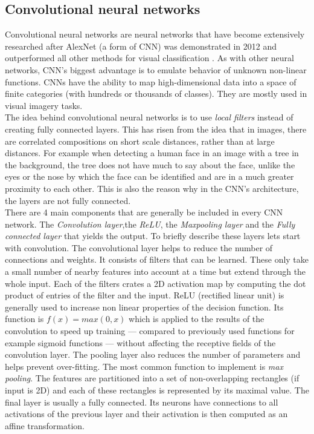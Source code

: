 \subsection{Convolutional neural networks}
Convolutional neural networks are neural networks that have become extensively researched after AlexNet (a form of CNN) was demonstrated in 2012 and outperformed all other methods for visual classification \cite{Krizhevsky:2012:ICD:2999134.2999257}. As with other neural networks, CNN's biggest advantage is to emulate behavior of unknown non-linear functions. CNNs have the ability to map high-dimensional data into a space of finite categories (with hundreds or thousands of classes). They are mostly used in visual imagery tasks. \\
The idea behind convolutional neural networks is to use \textit{local filters} instead of creating fully connected layers. This has risen from the idea that in images, there are correlated compositions on short scale distances, rather than at large distances. For example when detecting a human face in an image with a tree in the background, the tree does not have much to say about the face, unlike the eyes or the nose by which the face can be identified and are in a much greater proximity to each other. This is also the reason why in the CNN's architecture, the layers are not fully connected. \\
There are 4 main components that are generally be included in every CNN network. The \textit{Convolution layer},the \textit{ReLU}, the \textit{Maxpooling layer} and the \textit{Fully connected layer} that yields the output. To briefly describe these layers lets start with convolution. The convolutional layer helps to reduce the number of connections and weights. It consists of filters that can be learned. These only take a small number of nearby features into account at a time but extend through the whole input. Each of the filters crates a 2D activation map by computing the dot product of entries of the filter and the input. ReLU (rectified linear unit) is generally used to increase non linear properties of the decision function. Its function is $ f(x) = max(0,x) $ which is applied to the results of the convolution to speed up training --- compared to previously used functions for example sigmoid functions --- without affecting the receptive fields of the convolution layer. The pooling layer also reduces the number of parameters and helps prevent over-fitting. The most common function to implement is \textit{max pooling}. The features are partitioned into a set of non-overlapping rectangles (if input is 2D) and each of these rectangles  is represented by its maximal value. 
The final layer is usually a fully connected. Its neurons have connections to all activations of the previous layer and their activation is then computed as an affine transformation. 

